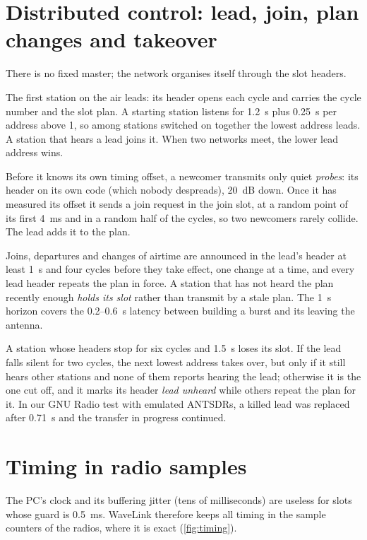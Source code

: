 \documentclass[11pt,a4paper,oneside]{report}
\begin{document}
\section{Distributed control: lead, join, plan changes and takeover}\label{sec:control}
There is no fixed master; the network organises itself through the slot headers.
\begin{description}[style=nextline,leftmargin=0pt,font=\sffamily\bfseries\color{wldeep}]
  \item[The lead.] The first station on the air leads: its header opens each cycle and carries the
    cycle number and the slot plan. A starting station listens for \SI{1.2}{s} plus \SI{0.25}{s} per
    address above 1, so among stations switched on together the lowest address leads. A station
    that hears a lead joins it. When two networks meet, the lower lead address wins.
  \item[Joining.] Before it knows its own timing offset, a newcomer transmits only quiet
    \emph{probes}: its header on its own code (which nobody despreads), \SI{20}{dB} down. Once it has
    measured its offset it sends a join request in the join slot, at a random point of its first
    \SI{4}{ms} and in a random half of the cycles, so two newcomers rarely collide. The lead adds it to
    the plan.
  \item[Plan changes.] Joins, departures and changes of airtime are announced in the lead's header
    at least \SI{1}{s} and four cycles before they take effect, one change at a time, and every lead
    header repeats the plan in force. A station that has not heard the plan recently enough
    \emph{holds its slot} rather than transmit by a stale plan. The \SI{1}{s} horizon covers the 0.2--\SI{0.6}{s}
    latency between building a burst and its leaving the antenna.
  \item[Leaving and takeover.] A station whose headers stop for six cycles and \SI{1.5}{s} loses its
    slot. If the lead falls silent for two cycles, the next lowest address takes over, but only if it
    still hears other stations and none of them reports hearing the lead; otherwise it is the one cut
    off, and it marks its header \emph{lead unheard} while others repeat the plan for it. In our
    GNU Radio test with emulated ANTSDRs, a killed lead was replaced after \SI{0.71}{s} and the transfer
    in progress continued.
\end{description}

\section{Timing in radio samples}\label{sec:timing}
The PC's clock and its buffering jitter (tens of milliseconds) are useless for slots whose guard is
\SI{0.5}{ms}. WaveLink therefore keeps all timing in the sample counters of the radios, where it is exact
(\cref{fig:timing}).
\end{document}
